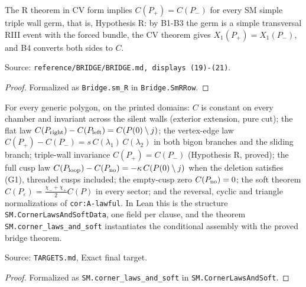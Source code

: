 \begin{obligation}\label{Bridge:theorem}\leanok
The R theorem in CV form implies $C(P_+)=C(P_-)$ for every SM simple triple wall germ, that is, Hypothesis R: by B1-B3
the germ is a simple transversal RIII event with the forced bundle, the CV theorem gives $X_1(P_+)=X_1(P_-)$, and B4
converts both sides to $C$.

Source: \texttt{reference/BRIDGE/BRIDGE.md, displays (19)-(21)}.
\end{obligation}
\begin{proof}\leanok{}
Formalized as \texttt{Bridge.sm\_R} in \texttt{Bridge.SmRRow}.
\end{proof}

\begin{theorem}\label{SM:corner_laws_and_soft}\leanok
For every generic polygon, on the printed domains: $C$ is constant on every chamber and invariant across the silent
walls (exterior extension, pure cut); the flat law $C(P_{\rm right})-C(P_{\rm left})=C(P(0)\setminus j)$; the vertex-edge
law $C(P_+)-C(P_-)=s\,C(\lambda_1)\,C(\lambda_2)$ in both bigon branches and the sliding branch; triple-wall invariance
$C(P_+)=C(P_-)$ (Hypothesis R, proved); the full cusp law $C(P_{\rm loop})-C(P_{\rm no})=-\kappa\,C(P(0)\setminus j)$
when the deletion satisfies (G1), threaded cusps included; the empty-cusp zero $C(P_{\rm no})=0$; the soft theorem
$C(P_\varepsilon)=\frac{\chi_-+\chi_+}2C(P)$ in every sector; and the reversal, cyclic and triangle normalizations of
\texttt{cor:A-lawful}. In Lean this is the structure \texttt{SM.CornerLawsAndSoftData}, one field per clause, and the
theorem \texttt{SM.corner\_laws\_and\_soft} instantiates the conditional assembly with the proved bridge theorem.

Source: \texttt{TARGETS.md}, Exact final target.
\end{theorem}
\begin{proof}\leanok{}
Formalized as \texttt{SM.corner\_laws\_and\_soft} in \texttt{SM.CornerLawsAndSoft}.
\end{proof}
